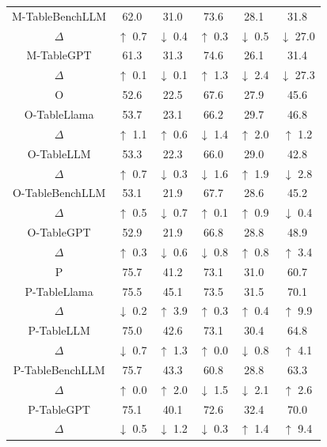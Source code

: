 \documentclass[11pt]{article}
\begin{document}
\begin{table}[t]
{\begin{tabular}{cccccc}
\midrule
M-TableBenchLLM & 62.0 & 31.0 & 73.6 & 28.1 & 31.8 \\
$\Delta$ & \hspace{-0.2em}$\uparrow$ 0.7 & \hspace{-0.2em}$\downarrow$ 0.4 & \hspace{-0.2em}$\uparrow$ 0.3 & \hspace{-0.2em}$\downarrow$ 0.5 & \hspace{-0.3em}$\downarrow$ 27.0 \\
\midrule
M-TableGPT & 61.3 & 31.3 & 74.6 & 26.1 & 31.4 \\
$\Delta$ & \hspace{-0.2em}$\uparrow$ 0.1 & \hspace{-0.2em}$\downarrow$ 0.1 & \hspace{-0.2em}$\uparrow$ 1.3 & \hspace{-0.2em}$\downarrow$ 2.4 & \hspace{-0.3em}$\downarrow$ 27.3 \\
\hline
\hline
O & 52.6 & 22.5 & 67.6 & 27.9 & 45.6 \\
O-TableLlama & 53.7 & 23.1 & 66.2 & 29.7 & 46.8 \\
$\Delta$ & $\uparrow$ 1.1 & $\uparrow$ 0.6 & $\downarrow$ 1.4 & $\uparrow$ 2.0 & $\uparrow$ 1.2 \\\hline
O-TableLLM & 53.3 & 22.3 & 66.0 & 29.0 & 42.8 \\
$\Delta$ & $\uparrow$ 0.7 & $\downarrow$ 0.3 & $\downarrow$ 1.6 & $\uparrow$ 1.9 & $\downarrow$ 2.8 \\\hline
O-TableBenchLLM & 53.1 & 21.9 & 67.7 & 28.6 & 45.2 \\
$\Delta$ & $\uparrow$ 0.5 & $\downarrow$ 0.7 & $\uparrow$ 0.1 & $\uparrow$ 0.9 & $\downarrow$ 0.4 \\\hline
O-TableGPT & 52.9 & 21.9 & 66.8 & 28.8 & 48.9 \\
$\Delta$ & $\uparrow$ 0.3 & $\downarrow$ 0.6 & $\downarrow$ 0.8 & $\uparrow$ 0.8 & $\uparrow$ 3.4 \\
\hline
\hline
P & 75.7 & 41.2 & 73.1 & 31.0 & 60.7 \\
P-TableLlama & 75.5 & 45.1 & 73.5 & 31.5 & 70.1 \\
$\Delta$ & $\downarrow$ 0.2 & $\uparrow$ 3.9 & $\uparrow$ 0.3 & $\uparrow$ 0.4 & $\uparrow$ 9.9 \\\hline
P-TableLLM & 75.0 & 42.6 & 73.1 & 30.4 & 64.8 \\
$\Delta$ & $\downarrow$ 0.7 & $\uparrow$ 1.3 & $\uparrow$ 0.0 & $\downarrow$ 0.8 & $\uparrow$ 4.1 \\\hline
P-TableBenchLLM & 75.7 & 43.3 & 60.8 & 28.8 & 63.3 \\
$\Delta$ & $\uparrow$ 0.0 & $\uparrow$ 2.0 & $\downarrow$ 1.5 & $\downarrow$ 2.1 & $\uparrow$ 2.6 \\\hline
P-TableGPT & 75.1 & 40.1 & 72.6 & 32.4 & 70.0 \\
$\Delta$ & $\downarrow$ 0.5 & $\downarrow$ 1.2 & $\downarrow$ 0.3 & $\uparrow$ 1.4 & $\uparrow$ 9.4 \\
\hline


\end{tabular}}
\end{table}
\end{document}
